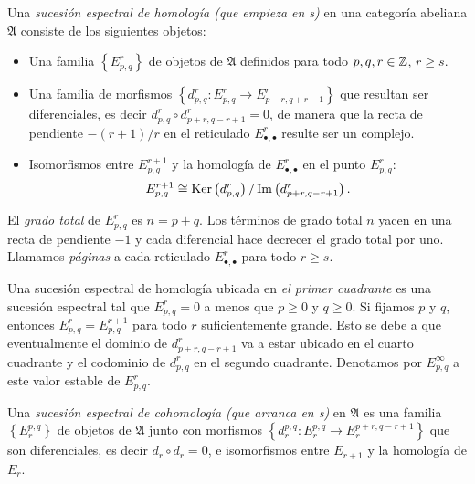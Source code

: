 \documentclass[a4paper,oneside,fleqn,11pt,../tesis.tex]{subfiles}
\begin{document}
\begin{definition}
    Una \emph{sucesión espectral de homología (que empieza en s)} en una categoría abeliana $\mathfrak{A}$ consiste de los siguientes objetos:
    \begin{itemize}
        \item Una familia $\left\lbrace E_{p, q}^{r} \right\rbrace$ de objetos de $\mathfrak{A}$ definidos para todo $p, q, r\in \mathbb{Z}$, $r\geq s$.
        \item Una familia de morfismos  $\left\lbrace d_{p, q}^{r}: E_{p, q}^{r} \to E_{p - r, q + r - 1}^{r} \right\rbrace$ que resultan
        ser diferenciales, es decir $d_{p, q}^{r} \circ d_{p + r, q - r + 1}^{r} = 0$, de manera que la recta de pendiente $-(r + 1)/r$ en el reticulado $E_{\bullet, \bullet}^{r}$ resulte ser un complejo.
        \item Isomorfismos entre $E_{p, q}^{r + 1}$ y la homología de $E^{r}_{\bullet, \bullet}$ en el punto $E_{p, q}^{r}$:
        \[
           E_{p, q}^{r + 1} \cong \operatorname{Ker}\left(d^{r}_{p, q}\right) / \operatorname{Im}\left(d^{r}_{p + r, q - r + 1}\right).
        \]
    \end{itemize}
    El \emph{grado total} de $E_{p, q}^{r}$ es $n = p + q$. Los términos de grado total $n$ yacen en una recta de pendiente $-1$ y cada
    diferencial hace decrecer el grado total por uno. Llamamos \emph{páginas} a cada reticulado $E_{\bullet, \bullet}^{r}$ para todo $r\geq s$.
\end{definition}

Una sucesión espectral de homología ubicada en \emph{el primer cuadrante}  es una sucesión espectral tal que $E_{p, q}^{r} = 0$ a menos que
$p \geq 0$ y $q \geq 0$. Si fijamos $p$ y $q$, entonces $E_{p, q}^{r} = E_{p, q}^{r + 1}$ para todo $r$ suficientemente grande. Esto se debe
a que eventualmente el dominio de $d^{r}_{p + r, q - r + 1}$ va a estar ubicado en el cuarto cuadrante y el codominio de $d^{r}_{p, q}$ en el segundo cuadrante. Denotamos por $E_{p, q}^{\infty}$ a este valor estable de $E_{p, q}^{r}$.

\begin{definition}
    Una \emph{sucesión espectral de cohomología (que arranca en s)} en $\mathfrak{A}$ es una familia $\left\lbrace E^{p, q}_{r} \right\rbrace$
    de objetos de $\mathfrak{A}$ junto con morfismos $\left\lbrace d^{p, q}_{r}: E^{p, q}_{r} \to E^{p + r, q - r + 1}_{r} \right\rbrace$
    que son diferenciales, es decir $d_r \circ d_r = 0$, e isomorfismos entre $E_{r + 1}$ y la homología de $E_r$.
\end{definition}
\end{document}

